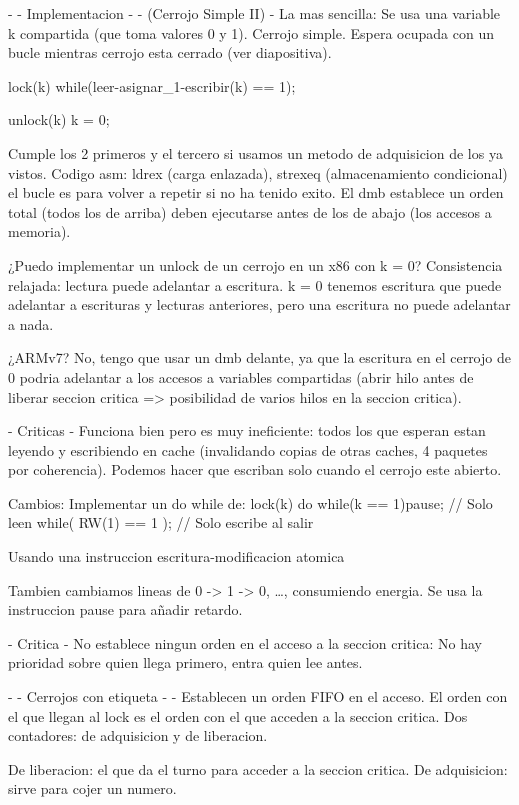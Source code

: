 - - Implementacion - -  (Cerrojo Simple II)
- La mas sencilla: Se usa una variable k compartida (que toma valores 0 y 1). Cerrojo simple.
Espera ocupada con un bucle mientras cerrojo esta cerrado (ver diapositiva).

lock(k){
    while(leer-asignar_1-escribir(k) == 1){};
}

unlock(k){
    k = 0;
}

Cumple los 2 primeros y el tercero si usamos un metodo de adquisicion de los ya vistos.
Codigo asm: ldrex (carga enlazada), strexeq (almacenamiento condicional) el bucle es para volver a repetir si no ha tenido exito. El dmb establece un orden total (todos los de arriba) deben ejecutarse antes de los de abajo (los accesos a memoria).


¿Puedo implementar un unlock de un cerrojo en un x86 con k = 0?
Consistencia relajada: lectura puede adelantar a escritura.
k = 0 tenemos escritura que puede adelantar a escrituras y lecturas anteriores, pero una escritura no puede adelantar a nada.

¿ARMv7?
No, tengo que usar un dmb delante, ya que la escritura en el cerrojo de 0 podria adelantar a los accesos a variables compartidas (abrir hilo antes de liberar seccion critica => posibilidad de varios hilos en la seccion critica).

- Criticas - 
Funciona bien pero es muy ineficiente: todos los que esperan estan leyendo y escribiendo en cache (invalidando copias de otras caches, 4 paquetes por coherencia).
Podemos hacer que escriban solo cuando el cerrojo este abierto.

Cambios:
Implementar un do while de:
lock(k){
    do{
        while(k == 1){pause;}    // Solo leen
    }while( RW(1) == 1 );   // Solo escribe al salir
}

Usando una instruccion escritura-modificacion atomica

Tambien cambiamos lineas de 0 -> 1 -> 0, \ldots, consumiendo energia.
Se usa la instruccion pause para añadir retardo.

- Critica -
No establece ningun orden en el acceso a la seccion critica: No hay prioridad sobre quien llega primero, entra quien lee antes.

- - Cerrojos con etiqueta - -
Establecen un orden FIFO en el acceso.
El orden con el que llegan al lock es el orden con el que acceden a la seccion critica.
Dos contadores: de adquisicion y de liberacion.

De liberacion: el que da el turno para acceder a la seccion critica. De adquisicion: sirve para cojer un numero.

